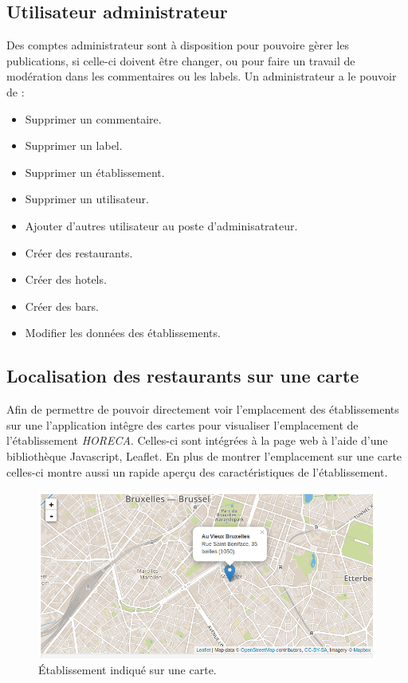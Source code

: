 \documentclass[a4paper,10pt]{article}
\begin{document}
\subsection{Utilisateur administrateur}
    Des comptes administrateur sont à disposition pour pouvoire gèrer les
    publications, si celle-ci doivent être changer, ou pour faire un travail de
    modération dans les commentaires ou les labels.
    Un administrateur a le pouvoir de :
    \begin{itemize}
        \item Supprimer un commentaire.
        \item Supprimer un label.
        \item Supprimer un établissement.
        \item Supprimer un utilisateur.
        \item Ajouter d'autres utilisateur au poste d'adminisatrateur.
        \item Créer des restaurants.
        \item Créer des hotels.
        \item Créer des bars.
        \item Modifier les données des établissements.
    \end{itemize}
\subsection{Localisation des restaurants sur une carte}
    Afin de permettre de pouvoir directement voir l'emplacement des
    établissements sur une l'application intêgre des cartes pour visualiser
    l'emplacement de l'établissement \emph{HORECA}. Celles-ci sont intégrées à
    la page web à l'aide d'une bibliothèque Javascript, Leaflet.
    En plus de montrer l'emplacement sur une carte celles-ci montre aussi un
    rapide aperçu des caractéristiques de l'établissement.

    \begin{figure}[hbt]
        \centering
        \includegraphics[scale=0.4]{./images/card.png}
        \caption{Établissement indiqué sur une carte.}
    \end{figure}
\end{document}
